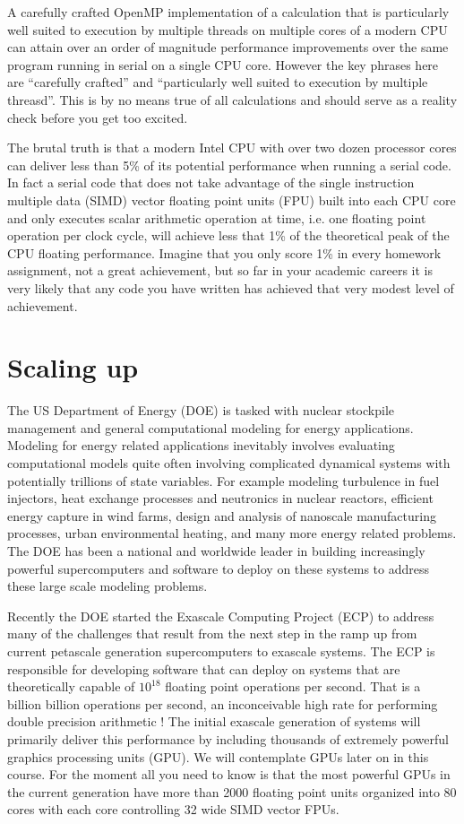 A carefully crafted OpenMP implementation of a calculation that is particularly well suited to execution by multiple threads on multiple cores of a modern CPU can attain over an order of magnitude performance improvements over the same program running in serial on a single CPU core. However the key phrases here are ``carefully crafted'' and ``particularly well suited to execution by multiple threasd''. This is by no means true of all calculations and should serve as a reality check before you get too excited.

The brutal truth is that a modern Intel CPU with over two dozen processor cores can deliver less than 5\% of its potential performance when running a serial code. In fact a serial code that does not take advantage of the single instruction multiple data (SIMD) vector floating point units (FPU) built into each CPU core and only executes scalar arithmetic operation at time, i.e. one floating point operation per clock cycle, will achieve less that 1\% of the theoretical peak of the CPU floating performance. Imagine that you only score 1\% in every homework assignment, not a great achievement, but so far in your academic careers it is very likely that any code you have written has achieved that very modest level of achievement.

\section{Scaling up}

The US Department of Energy (DOE) is tasked with nuclear stockpile management and general computational modeling for energy applications. Modeling for energy related applications inevitably involves evaluating computational models quite often involving complicated dynamical systems with potentially trillions of state variables. For example modeling turbulence in fuel injectors, heat exchange processes and neutronics in nuclear reactors, efficient energy capture in wind farms, design and analysis of nanoscale manufacturing processes, urban environmental heating, and many more energy related problems. The DOE has been a national and worldwide leader in building increasingly powerful supercomputers and software to deploy on these systems to address these large scale modeling problems. 

Recently the DOE started the Exascale Computing Project (ECP) to address many of the challenges that result from the next step in the ramp up from current petascale generation supercomputers to exascale systems. The ECP is responsible for developing software that can deploy on systems that are theoretically capable of $10^{18}$ floating point operations per second. That is a billion billion operations per second, an inconceivable high rate for performing double precision arithmetic ! The initial exascale generation of systems will primarily deliver this performance by including thousands of extremely powerful graphics processing units (GPU). We will contemplate GPUs later on in this course. For the moment all you need to know is that the most powerful GPUs in the current generation have more than 2000 floating point units organized into 80 cores with each core controlling 32 wide SIMD vector FPUs.

